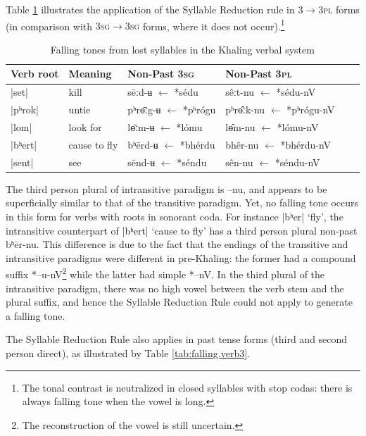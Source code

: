 \documentclass[oldfontcommands,oneside,a4paper,11pt]{article}
\newcommand{\ipa}[1]{{\phon \mbox{#1}}} %
\begin{document}
Table  \ref{tab:falling.verb2} illustrates the application of the Syllable Reduction rule in \textsc{3$\rightarrow$3pl} forms (in comparison with \textsc{3sg$\rightarrow$3sg} forms, where it does not occur).\footnote{The tonal contrast is neutralized  in closed syllables with stop codas: there is always falling tone when the vowel is long. }
 
\begin{table}[h] 
\caption{Falling tones from lost syllables in the Khaling verbal system} \centering  \label{tab:falling.verb2} 
\begin{tabular}{llllll} 
\toprule 
Verb root	&Meaning	&Non-Past \textsc{3sg} & Non-Past \textsc{3pl} & \\ 
\midrule 
|\ipa{set}|	&	kill			&\ipa{sēːd-ʉ} $\leftarrow$ \ipa{*sédu} &\ipa{sêːt-nu} $\leftarrow$ \ipa{*sédu-nV} \\ 
|\ipa{pʰrok}|	&	untie		&\ipa{pʰrɵ̄ːg-ʉ} $\leftarrow$ \ipa{*pʰrógu} &\ipa{pʰrɵ̂ːk-nu} $\leftarrow$  \ipa{*pʰrógu-nV} \\
|\ipa{lom}|	&	look for		&\ipa{lɵ̄ːm-ʉ} $\leftarrow$ \ipa{*lómu} &\ipa{lɵ̂m-nu} $\leftarrow$ \ipa{*lómu-nV} \\ 
\midrule
|\ipa{bʰert}|	&	cause to fly			&\ipa{bʰērd-ʉ} $\leftarrow$ \ipa{*bhérdu}&\ipa{bhêr-nu} $\leftarrow$ \ipa{*bhérdu-nV} \\ 
|\ipa{sent}|	&	see			&\ipa{sēnd-ʉ} $\leftarrow$ \ipa{*séndu} &\ipa{sên-nu} $\leftarrow$ \ipa{*séndu-nV} \\ 
\bottomrule 
\end{tabular} 
\end{table} 
The  third person plural of intransitive paradigm is \ipa{--nu}, and appears to be superficially similar to that of the transitive paradigm. Yet,  no falling tone occurs in this form for verbs with roots in sonorant coda. For instance |\ipa{bʰer}| `fly', the intransitive counterpart of |\ipa{bʰert}|	`cause to fly' has a third person plural non-past \ipa{bʰēr-nu}. This difference is due to the fact that the endings of the transitive and  intransitive paradigms were different in pre-Khaling: the former had a compound suffix \ipa{*--u-nV}\footnote{The reconstruction of the vowel    is still uncertain.} while the latter had simple \ipa{*--nV}. In the third plural of the intransitive paradigm, there was no high vowel between the verb stem and the plural suffix, and hence the Syllable Reduction Rule could not apply to generate a falling tone.




The Syllable Reduction Rule also applies in past tense forms (third and second person direct), as illustrated by Table \ref{tab:falling.verb3}. 
\end{document}
